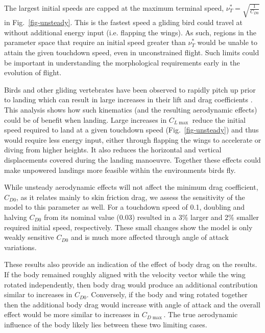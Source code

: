 The largest initial speeds are capped at the maximum terminal speed, $\nu_T^* = \sqrt{\frac{1}{C_{D0}}}$ in Fig.~\ref{fig-unsteady}. This is the fastest speed a gliding bird could travel at without additional energy input (i.e. flapping the wings). As such, regions in the parameter space that require an initial speed greater than $\nu_T^*$ would be unable to attain the given touchdown speed, even in unconstrained flight. Such limits could be important in understanding the morphological requirements early in the evolution of flight.

Birds \cite{carruthersAutomaticAeroelasticDevices2007,poletRapidAreaChange2015,kleinheerenbrinkOptimizationAvianPerching2022} and other gliding vertebrates \cite{bahlmanGlidePerformanceAerodynamics2013,khandelwalHowBiomechanicsPath2020} have been observed to rapidly pitch up prior to landing which can result in large increases in their lift and drag coefficients \cite{granlundUnsteadyPitchingFlat2013,poletUnsteadyDynamicsRapid2015}. This analysis shows how such kinematics (and the resulting aerodynamic effects) could be of benefit when landing. Large increases in $C_{L\max}$ reduce the initial speed required to land at a given touchdown speed (Fig.~\ref{fig-unsteady}) and thus would require less energy input, either through flapping the wings to accelerate or diving from higher heights. It also reduces the horizontal and vertical displacements covered during the landing manoeuvre. Together these effects could make unpowered landings more feasible within the environments birds fly.

While unsteady aerodynamic effects will not affect the minimum drag coefficient, $C_{D0}$, as it relates mainly to skin friction drag, we assess the sensitivity of the model to this parameter as well. For a touchdown speed of 0.1, doubling and halving $C_{D0}$ from its nominal value (0.03) resulted in a 3\% larger and 2\% smaller required initial speed, respectively. These small changes show the model is only weakly sensitive $C_{D0}$ and is much more affected through angle of attack variations.

These results also provide an indication of the effect of body drag on the results. If the body remained roughly aligned with the velocity vector while the wing rotated independently, then body drag would produce an additional contribution similar to increases in $C_{D0}$. Conversely, if the body and wing rotated together then the additional body drag would increase with angle of attack and the overall effect would be more similar to increases in $C_{D\max}$. The true aerodynamic influence of the body likely lies between these two limiting cases.

